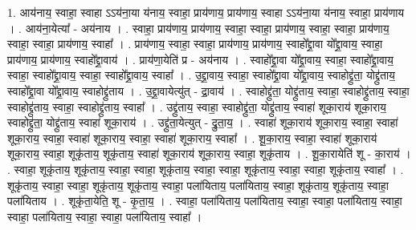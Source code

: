 \documentclass[17pt]{extarticle}
\begin{document}
1. आय॑नाय॒ स्वाहा॒ स्वाहा ऽऽय॑ना॒या य॑नाय॒ स्वाहा॒ प्राय॑णाय॒ प्राय॑णाय॒ स्वाहा ऽऽय॑ना॒या य॑नाय॒ स्वाहा॒ प्राय॑णाय । . आय॑ना॒येत्या᳚ - अय॑नाय । . स्वाहा॒ प्राय॑णाय॒ प्राय॑णाय॒ स्वाहा॒ स्वाहा॒ प्राय॑णाय॒ स्वाहा॒ स्वाहा॒ प्राय॑णाय॒ स्वाहा॒ स्वाहा॒ प्राय॑णाय॒ स्वाहा᳚ । . प्राय॑णाय॒ स्वाहा॒ स्वाहा॒ प्राय॑णाय॒ प्राय॑णाय॒ स्वाहो᳚द्द्रा॒वा यो᳚द्द्रा॒वाय॒ स्वाहा॒ प्राय॑णाय॒ प्राय॑णाय॒ स्वाहो᳚द्द्रा॒वाय॑ । . प्राय॑णा॒येति॑ प्र - अय॑नाय । . स्वाहो᳚द्द्रा॒वा यो᳚द्द्रा॒वाय॒ स्वाहा॒ स्वाहो᳚द्द्रा॒वाय॒ स्वाहा॒ स्वाहो᳚द्द्रा॒वाय॒ स्वाहा॒ स्वाहो᳚द्द्रा॒वाय॒ स्वाहा᳚ । . उ॒द्द्रा॒वाय॒ स्वाहा॒ स्वाहो᳚द्द्रा॒वा यो᳚द्द्रा॒वाय॒ स्वाहोद्द्रु॑ता॒ योद्द्रु॑ताय॒ स्वाहो᳚द्द्रा॒वा यो᳚द्द्रा॒वाय॒ 
स्वाहोद्द्रु॑ताय । . उ॒द्द्रा॒वायेत्यु॑त् - द्रा॒वाय॑ । . स्वाहोद्द्रु॑ता॒ योद्द्रु॑ताय॒ स्वाहा॒ स्वाहोद्द्रु॑ताय॒ स्वाहा॒ स्वाहोद्द्रु॑ताय॒ स्वाहा॒ स्वाहोद्द्रु॑ताय॒ स्वाहा᳚ । . उद्द्रु॑ताय॒ स्वाहा॒ स्वाहोद्द्रु॑ता॒ योद्द्रु॑ताय॒ स्वाहा॑ शूका॒राय॑ शूका॒राय॒ स्वाहोद्द्रु॑ता॒ योद्द्रु॑ताय॒ स्वाहा॑ शूका॒राय॑ । . उद्द्रु॑ता॒येत्युत् - द्रु॒ता॒य॒ । . स्वाहा॑ शूका॒राय॑ शूका॒राय॒ स्वाहा॒ स्वाहा॑ शूका॒राय॒ स्वाहा॒ स्वाहा॑ शूका॒राय॒ स्वाहा॒ स्वाहा॑ शूका॒राय॒ स्वाहा᳚ । . शू॒का॒राय॒ स्वाहा॒ स्वाहा॑ शूका॒राय॑ शूका॒राय॒ स्वाहा॒ शूकृ॑ताय॒ शूकृ॑ताय॒ स्वाहा॑ शूका॒राय॑ शूका॒राय॒ स्वाहा॒ शूकृ॑ताय । . शू॒का॒रायेति॑ शू - का॒राय॑ । . स्वाहा॒ शूकृ॑ताय॒ शूकृ॑ताय॒ स्वाहा॒ स्वाहा॒ शूकृ॑ताय॒ स्वाहा॒ स्वाहा॒ शूकृ॑ताय॒ स्वाहा॒ स्वाहा॒ शूकृ॑ताय॒ स्वाहा᳚ । . शूकृ॑ताय॒ स्वाहा॒ स्वाहा॒ शूकृ॑ताय॒ शूकृ॑ताय॒ स्वाहा॒ पला॑यिताय॒ पला॑यिताय॒ स्वाहा॒ शूकृ॑ताय॒ शूकृ॑ताय॒ स्वाहा॒ पला॑यिताय । . शूकृ॑ता॒येति॒ शू - कृ॒ता॒य॒ । . स्वाहा॒ पला॑यिताय॒ पला॑यिताय॒ स्वाहा॒ स्वाहा॒ पला॑यिताय॒ स्वाहा॒ स्वाहा॒ पला॑यिताय॒ स्वाहा॒ स्वाहा॒ पला॑यिताय॒ स्वाहा᳚ । \newline
\end{document}
